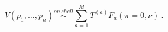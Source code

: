 \begin{equation}
V(p_1, \ldots , p_n) \stackrel{on\, shell} {\sim}
\sum\limits_{a=1}^{M} T^{(a)} F_a(\pi = 0, \nu)\ .
\label{1.5}
\end{equation}

